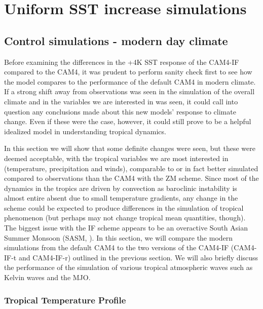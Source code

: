 \documentclass[letterpaper,12pt,titlepage,oneside,final]{book}
\begin{document}
\chapter{Uniform SST increase simulations}
\section{Control simulations - modern day climate}
Before examining the differences in the +4K SST response of the CAM4-IF compared to the CAM4, it was prudent to perform sanity check first to see how the model compares to the performance of the default CAM4 in modern climate. If a strong shift away from observations was seen in the simulation of the overall climate and in the variables we are interested in was seen, it could call into question any conclusions made about this new models' response to climate change. Even if these were the case, however, it could still prove to be a helpful idealized model in understanding tropical dynamics. 

In this section we will show that some definite changes were seen, but these were deemed acceptable, with the tropical variables we are most interested in (temperature, precipitation and winds), comparable to or in fact better simulated compared to observations than the CAM4 with the ZM scheme. Since most of the dynamics in the tropics are driven by convection as baroclinic instability is almost entire absent due to small temperature gradients, any change in the scheme could be expected to produce differences in the simulation of tropical phenomenon (but perhaps may not change tropical mean quantities, though). The biggest issue with the IF scheme appears to be an overactive South Asian Summer Monsoon (SASM, \cite{fan_future_2012}). In this section, we will compare the modern simulations from the default CAM4 to the two versions of the CAM4-IF (CAM4-IF-t and CAM4-IF-r) outlined in the previous section. We will also briefly discuss the performance of the simulation of various tropical atmospheric waves such as Kelvin waves and the MJO. 

\subsection{Tropical Temperature Profile}
\end{document}
